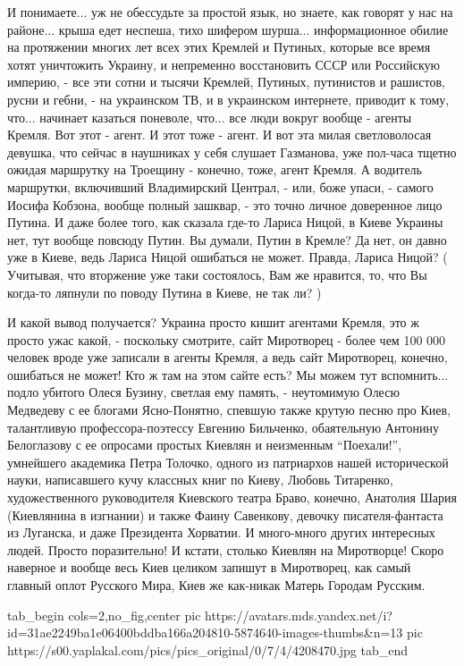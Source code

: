 И понимаете... уж не обессудьте за простой язык, но знаете, как говорят у нас
на районе...  крыша едет неспеша, тихо шифером шурша... информационное обилие
на протяжении многих лет всех этих Кремлей и Путиных, которые все время хотят
уничтожить Украину, и непременно восстановить СССР или Российскую империю, -
все эти сотни и тысячи Кремлей, Путиных, путинистов и рашистов, русни и гебни,
- на украинском ТВ, и в украинском интернете, приводит к тому, что... начинает
казаться поневоле, что... все люди вокруг вообще - агенты Кремля. Вот этот -
агент. И этот тоже - агент. И вот эта милая светловолосая девушка, что сейчас в
наушниках у себя слушает Газманова, уже пол-часа тщетно ожидая маршрутку на
Троещину - конечно, тоже, агент Кремля. А водитель маршрутки, включивший
Владимирский Централ, - или, боже упаси, - самого Иосифа Кобзона, вообще полный
зашквар, - это точно личное доверенное лицо Путина. И даже более того, как
сказала где-то Лариса Ницой, в Киеве Украины нет, тут вообще повсюду Путин. Вы
думали, Путин в Кремле? Да нет, он давно уже в Киеве, ведь Лариса Ницой
ошибаться не может.  Правда, Лариса Ницой? ( Учитывая, что вторжение уже таки
состоялось, Вам же нравится, то, что Вы когда-то ляпнули по поводу Путина в
Киеве, не так ли? )

И какой вывод получается? Украина просто кишит агентами Кремля, это ж просто
ужас какой, - поскольку смотрите, сайт Миротворец - более чем 100 000  человек
вроде уже записали в агенты Кремля, а ведь сайт Миротворец, конечно, ошибаться
не может!  Кто ж там на этом сайте есть? Мы можем тут вспомнить... подло
убитого Олеся Бузину, светлая ему память, - неутомимую Олесю Медведеву с ее
блогами Ясно-Понятно, спевшую также крутую песню про Киев, талантливую
профессора-поэтессу Евгению Бильченко, обаятельную Антонину Белоглазову с ее
опросами простых Киевлян и неизменным \enquote{Поехали!}, умнейшего академика
Петра Толочко, одного из патриархов нашей исторической науки, написавшего кучу
классных книг по Киеву, Любовь Титаренко, художественного руководителя
Киевского театра Браво, конечно, Анатолия Шария (Киевлянина в изгнании) и также
Фаину Савенкову, девочку писателя-фантаста из Луганска, и даже Президента
Хорватии. И много-много других интересных людей.  Просто поразительно!  И
кстати, столько Киевлян на Миротворце! Скоро наверное и вообще весь Киев
целиком запишут в Миротворец, как самый главный оплот Русского Мира, Киев же
как-никак Матерь Городам Русским.

\ifcmt
  tab_begin cols=2,no_fig,center
     pic https://avatars.mds.yandex.net/i?id=31ae2249ba1e06400bddba166a204810-5874640-images-thumbs&n=13
		 pic https://s00.yaplakal.com/pics/pics_original/0/7/4/4208470.jpg
  tab_end
\fi

